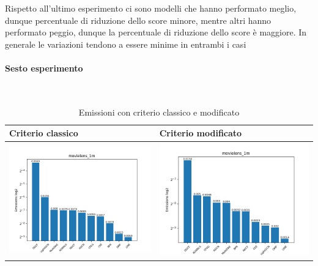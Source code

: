 \noindent Rispetto all'ultimo esperimento ci sono modelli che hanno performato meglio, dunque percentuale di riduzione dello score minore, mentre altri hanno performato peggio, dunque la percentuale di riduzione dello score è maggiore. In generale le variazioni tendono a essere minime in entrambi i casi

\paragraph{Sesto esperimento} \textcolor{white}{.}\\
\begin{table}[H]
    \centering
    \footnotesize
    \setlength\tabcolsep{0pt}
    \begin{tabularx}{\textwidth}{|X|X|}
        \hline
        \textbf{Criterio classico} & \textbf{Criterio modificato} \\
        \hline
        \includegraphics[width=\linewidth, trim=0 0 0 0]{images/emissions_movielens_1m_30_7_earlyClassic.png} &
        \includegraphics[width=\linewidth, trim=0 0 0 0]{images/emissions_movielens_1m_30_7_earlyModified.png} \\
        \hline
    \end{tabularx}
    \caption{Emissioni con criterio classico e modificato}
    \label{tab:emissions_info}
\end{table}


